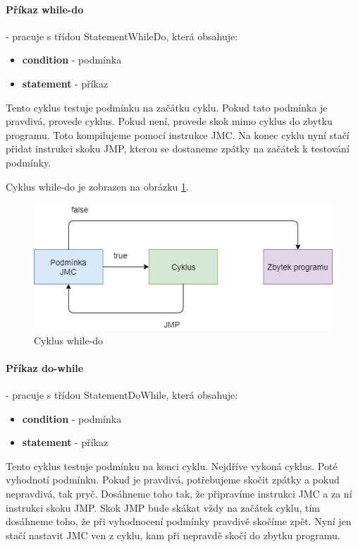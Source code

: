 \documentclass[
12pt,
a4paper,
pdftex,
czech,
titlepage
]{report}
\begin{document}
\paragraph{Příkaz while-do} - pracuje s třídou StatementWhileDo, která obsahuje:
\begin{itemize}
\item \textbf{condition} - podmínka
\item \textbf{statement} - příkaz
\end{itemize}

Tento cyklus testuje podmínku na začátku cyklu. Pokud tato podmínka je pravdivá, provede cyklus. Pokud není, provede skok mimo cyklus do zbytku programu. Toto kompilujeme pomocí instrukce JMC. Na konec cyklu nyní stačí přidat instrukci skoku JMP, kterou se dostaneme zpátky na začátek k testování podmínky.

Cyklus while-do je zobrazen na obrázku \ref{whileDo}. 

\begin{figure}[h]
\caption{Cyklus while-do}
\label{whileDo}
\includegraphics[width=\textwidth]{whileDo.png}
\end{figure}

\paragraph{Příkaz do-while} - pracuje s třídou StatementDoWhile, která obsahuje:
\begin{itemize}
\item \textbf{condition} - podmínka
\item \textbf{statement} - příkaz
\end{itemize}

Tento cyklus testuje podmínku na konci cyklu. Nejdříve vykoná cyklus. Poté vyhodnotí podmínku. Pokud je pravdivá, potřebujeme skočit zpátky a pokud nepravdivá, tak pryč. Dosáhneme toho tak, že připravíme instrukci JMC a za ní instrukci skoku JMP. Skok JMP bude skákat vždy na začátek cyklu, tím dosáhneme toho, že při vyhodnocení podmínky pravdivě skočíme zpět. Nyní jen stačí nastavit JMC ven z cyklu, kam při nepravdě skočí do zbytku programu.
\end{document}
